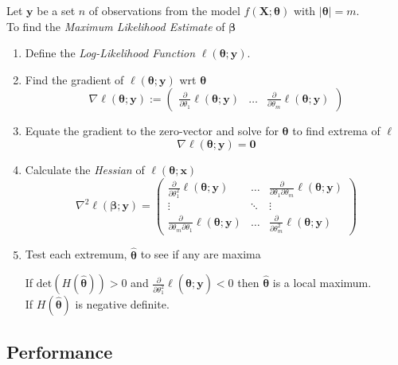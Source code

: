 \documentclass[11pt,a4paper]{article}
\begin{document}
Let $\textbf{y}$ be a set $n$ of observations from the model $f(\textbf{X};\pmb\theta)$ with $|\pmb\theta|=m$.\\
To find the \textit{Maximum Likelihood Estimate} of $\pmb\beta$
\begin{enumerate}
	\item Define the \textit{Log-Likelihood Function} $\ell(\pmb\theta;\textbf{y})$.
	\item Find the gradient of $\ell(\pmb\theta;\textbf{y})$ wrt $\pmb\theta$
	$$\nabla\ell(\pmb\theta;\textbf{y}):=\begin{pmatrix}\frac\partial{\partial\theta_1}\ell(\pmb\theta;\textbf{y})&\dots&\frac\partial{\partial\theta_m}\ell(\pmb\theta;\textbf{y})\end{pmatrix}$$
	\item Equate the gradient to the zero-vector and solve for $\pmb\theta$ to find extrema of $\ell$
	$$\nabla\ell(\pmb\theta;\textbf{y})=\pmb0$$
	\item Calculate the \textit{Hessian} of $\ell(\pmb\theta;\textbf{x})$
	$$\nabla^2\ell(\pmb\beta;\textbf{y})=\begin{pmatrix}\frac{\partial}{\partial\theta_1^2}\ell(\pmb\theta;\textbf{y})&\dots&\frac{\partial}{\partial\theta_1\partial\theta_m}\ell(\pmb\theta;\textbf{y})\\\vdots&\ddots&\vdots\\\frac{\partial}{\partial\theta_m\partial\theta_1}\ell(\pmb\theta;\textbf{y})&\dots&\frac{\partial}{\partial\theta_m^2}\ell(\pmb\theta;\textbf{y})\end{pmatrix}$$
	\item Test each extremum, $\hat{\pmb\theta}$ to see if any are maxima
	\begin{center}
	If $\text{det}(H(\hat{\pmb\theta}))>0$ and $\frac\partial{\partial\theta_1^2}\ell(\hat{\pmb\theta};\textbf{y})<0$ then $\hat{\pmb\theta}$ is a local maximum.\\
	\ie If $H(\hat{\pmb\theta})$ is negative definite.
	\end{center}
\end{enumerate}


\subsection{Performance}
\end{document}
